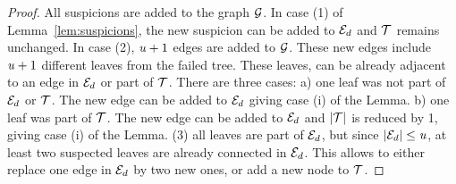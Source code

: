 \begin{proof}
  All suspicions are added to the graph $\mathcal{G}$.
  In case (1) of Lemma~\ref{lem:suspicions}, the new suspicion can be added to $\mathcal{E}_d$ and $\mathcal{T}$ remains unchanged.
  In case (2), $\mathit{u}+1$ edges are added to $\mathcal{G}$.
  These new edges include $\mathit{u}+1$ different leaves from the failed tree. These leaves, can be already adjacent to an edge in $\mathcal{E}_d$ or part of $\mathcal{T}$.
  There are three cases:
a) one leaf was not part of $\mathcal{E}_d$ or $\mathcal{T}$. The new edge can be added to $\mathcal{E}_d$ giving case (i) of the Lemma.
b) one leaf was part of $\mathcal{T}$. The new edge can be added to $\mathcal{E}_d$ and $|\mathcal{T}|$ is reduced by 1, giving case (i) of the Lemma.
(3) all leaves are part of $\mathcal{E}_d$, but since $|\mathcal{E}_d|\leq \mathit{u}$, at least two suspected leaves are already connected in $\mathcal{E}_d$. This allows to either replace one edge in $\mathcal{E}_d$ by two new ones, or add a new node to $\mathcal{T}$.
\end{proof}

